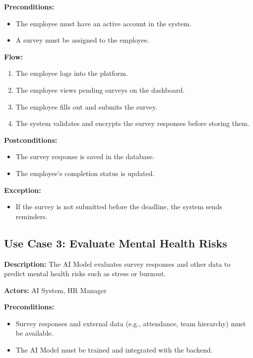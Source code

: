 \documentclass[conference]{IEEEtran}
\begin{document}
        \textbf{Preconditions:}
        \begin{itemize}
            \item The employee must have an active account in the system.
            \item A survey must be assigned to the employee.
        \end{itemize}
        
        \textbf{Flow:}
        \begin{enumerate}
            \item The employee logs into the platform.
            \item The employee views pending surveys on the dashboard.
            \item The employee fills out and submits the survey.
            \item The system validates and encrypts the survey responses before storing them.
        \end{enumerate}
        
        \textbf{Postconditions:}
        \begin{itemize}
            \item The survey response is saved in the database.
            \item The employee's completion status is updated.
        \end{itemize}
        
        \textbf{Exception:}
        \begin{itemize}
            \item If the survey is not submitted before the deadline, the system sends reminders.
        \end{itemize}
        
        \subsection{Use Case 3: Evaluate Mental Health Risks}
        
        \textbf{Description:} The AI Model evaluates survey responses and other data to predict mental health risks such as stress or burnout.
        
        \textbf{Actors:} AI System, HR Manager
        
        \textbf{Preconditions:}
        \begin{itemize}
            \item Survey responses and external data (e.g., attendance, team hierarchy) must be available.
            \item The AI Model must be trained and integrated with the backend.
        \end{itemize}
        
\end{document}
